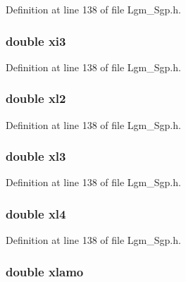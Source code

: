 Definition at line 138 of file Lgm\_\-Sgp.h.\hypertarget{struct___sgp_info_90e3204b70e2fc9053c1879656ca4bc7}{
\subsubsection[{xi3}]{\setlength{\rightskip}{0pt plus 5cm}double {\bf xi3}}}
\label{struct___sgp_info_90e3204b70e2fc9053c1879656ca4bc7}




Definition at line 138 of file Lgm\_\-Sgp.h.\hypertarget{struct___sgp_info_965576393853e94605542dbd4df08cfe}{
\subsubsection[{xl2}]{\setlength{\rightskip}{0pt plus 5cm}double {\bf xl2}}}
\label{struct___sgp_info_965576393853e94605542dbd4df08cfe}




Definition at line 138 of file Lgm\_\-Sgp.h.\hypertarget{struct___sgp_info_db2bab7e771a89101eaf1dd3d527fcf3}{
\subsubsection[{xl3}]{\setlength{\rightskip}{0pt plus 5cm}double {\bf xl3}}}
\label{struct___sgp_info_db2bab7e771a89101eaf1dd3d527fcf3}




Definition at line 138 of file Lgm\_\-Sgp.h.\hypertarget{struct___sgp_info_5233fa6736de1f47b91f58865ea7cb80}{
\subsubsection[{xl4}]{\setlength{\rightskip}{0pt plus 5cm}double {\bf xl4}}}
\label{struct___sgp_info_5233fa6736de1f47b91f58865ea7cb80}




Definition at line 138 of file Lgm\_\-Sgp.h.\hypertarget{struct___sgp_info_53f269b680646e524c0d190ceea30d2d}{
\subsubsection[{xlamo}]{\setlength{\rightskip}{0pt plus 5cm}double {\bf xlamo}}}
\label{struct___sgp_info_53f269b680646e524c0d190ceea30d2d}





